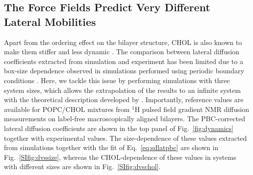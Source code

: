 \documentclass[aps,prl,superscriptaddress]{revtex4-2}
\begin{document}

\subsection{The Force Fields Predict Very Different Lateral Mobilities}

Apart from the ordering effect on the bilayer structure, CHOL is also known to make them stiffer and less dynamic \cite{rog2009ordering,filippov2003effect,filippov2003influence}. The comparison between lateral diffusion coefficients extracted from simulation and experiment has been limited due to a box-size dependence observed in simulations performed using periodic boundary conditions \cite{vogele2016divergent,vogele2018hydrodynamics,camley2015strong}. Here, we tackle this issue by performing simulations with three system sizes, which allows the extrapolation of the results to an infinite system with the theoretical description developed by \citeauthor{vogele2016divergent}  \cite{vogele2018hydrodynamics,vogele2018hydrodynamics}. Importantly, reference values are available for POPC/CHOL mixtures from $^1$H pulsed field gradient NMR diffusion measurements on label-free macroscopically aligned bilayers. The PBC-corrected lateral diffusion coefficients are shown in the top panel of Fig.~\ref{fig:dynamics} together with experimental values. The size-dependence of these values extracted from simulations together with the fit of Eq.~\eqref{eq:sdlatpbc} are shown in Fig.~\ref{SIfig:dvssize}, whereas the CHOL-dependence of these values in systems with different sizes are shown in Fig.~\ref{SIfig:dvschol}. 
\end{document}
